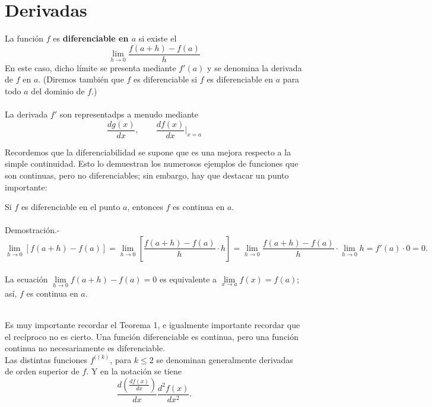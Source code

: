 \chapter{Derivadas}

\begin{tcolorbox}
    \begin{def.}
    La función $f$ es \textbf{\boldmath diferenciable en $a$} si existe el  
    $$\lim_{h\to 0}\dfrac{f(a+h)-f(a)}{h}$$
    En este caso, dicho límite se presenta mediante $f'(a)$ y se denomina la derivada de $f$ en $a$. (Diremos también que $f$ es diferenciable si $f$ es diferenciable en $a$ para todo $a$ del dominio de $f.$)\\\\
    La derivada $f'$ son representadps a menudo mediante
    $$\dfrac{dg(x)}{dx}, \qquad \dfrac{df(x)}{dx}\bigg|_{x=a}$$
    \end{def.}
\end{tcolorbox}

Recordemos que la diferenciabilidad se supone que es una mejora respecto a la simple continuidad. Esto lo demuestran los numerosos ejemplos de funciones que son continuas, pero no diferenciables; sin embargo, hay que destacar un punto importante:\\

\begin{teo}
    Si $f$ es diferenciable en el punto $a$, entonces $f$ es continua en $a$.\\\\
	Demostración.-\;
	$$\lim_{h\to 0} \left[f(a+h)-f(a)\right] = \lim_{h\to 0} \left[\dfrac{f(a+h)-f(a)}{h}\cdot h\right] = \lim_{h\to 0} \dfrac{f(a+h)-f(a)}{h}\cdot \lim_{h\to 0} h = f'(a)\cdot 0 = 0.$$\\
	La ecuación $\lim\limits_{h\to 0}f(a+h)-f(a)=0$ es equivalente a $\lim\limits_{x\to a} f(x)=f(a);$ así, $f$ es continua en $a$.\\\\
\end{teo}

Es muy importante recordar el Teorema 1, e igualmente importante recordar que el recíproco no es cierto. Una función diferenciable es continua, pero una función continua no necesariamente es diferenciable.\\

Las distintas funciones $f^{((k)}$, para $k\leq 2$ se denominan generalmente derivadas de orden superior de $f$. Y en la notación se tiene $$\dfrac{d\left(\frac{df(x)}{dx}\right)}{dx}\dfrac{d^2f(x)}{dx^2}.$$

